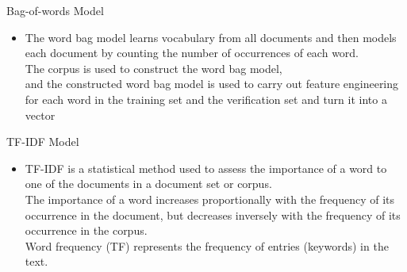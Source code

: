 \documentclass[
 size=14pt,
 paper=smartboard,  %
 mode=present, 		%
 display=slides, 	%
 style=tuliplab,  	%
 pauseslide,
 fleqn,leqno]{powerdot}
\begin{document}
\begin{slide}{Bag-of-words Model}
  
  \begin{itemize}
  \item  
    The word bag model learns vocabulary from all documents and then models each document
    by counting the number of occurrences of each word.
    \\The corpus is used to construct the word bag model, 
    \\and the constructed word bag model is used to carry out feature engineering 
    \\for each word in the training set and the verification set and turn it into a vector
  \end{itemize}
\end{slide}
\begin{slide}{TF-IDF Model}
  
  \begin{itemize}
  \item  
    TF-IDF is a statistical method used to assess the importance of a word to one of the documents 
    in a document set or corpus.
    \\The importance of a word increases proportionally with the frequency of its occurrence in the document, 
    but decreases inversely with the frequency of its occurrence in the corpus.
    \\Word frequency (TF) represents the frequency of entries (keywords) in the text.
  \end{itemize}
\end{slide}
\end{document}

